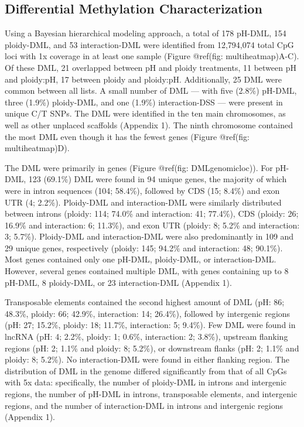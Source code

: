 \documentclass [11pt, proquest] {uwthesis}[2015/03/03]
\begin{document}
\hypertarget{differential-methylation-characterization}{%
\subsection{Differential Methylation Characterization}\label{differential-methylation-characterization}}

Using a Bayesian hierarchical modeling approach, a total of 178 pH-DML, 154 ploidy-DML, and 53 interaction-DML were identified from 12,794,074 total CpG loci with 1x coverage in at least one sample (Figure @ref(fig: multiheatmap)A-C). Of these DML, 21 overlapped between pH and ploidy treatments, 11 between pH and ploidy:pH, 17 between ploidy and ploidy:pH. Additionally, 25 DML were common between all lists. A small number of DML --- with five (2.8\%) pH-DML, three (1.9\%) ploidy-DML, and one (1.9\%) interaction-DSS --- were present in unique C/T SNPs. The DML were identified in the ten main chromosomes, as well as other unplaced scaffolds (Appendix 1). The ninth chromosome contained the most DML even though it has the fewest genes (Figure @ref(fig: multiheatmap)D).

The DML were primarily in genes (Figure @ref(fig: DMLgenomicloc)). For pH-DML, 123 (69.1\%) DML were found in 94 unique genes, the majority of which were in intron sequences (104; 58.4\%), followed by CDS (15; 8.4\%) and exon UTR (4; 2.2\%). Ploidy-DML and interaction-DML were similarly distributed between introns (ploidy: 114; 74.0\% and interaction: 41; 77.4\%), CDS (ploidy: 26; 16.9\% and interaction: 6; 11.3\%), and exon UTR (ploidy: 8; 5.2\% and interaction: 3; 5.7\%). Ploidy-DML and interaction-DML were also predominantly in 109 and 29 unique genes, respectively (ploidy: 145; 94.2\% and interaction: 48; 90.1\%). Most genes contained only one pH-DML, ploidy-DML, or interaction-DML. However, several genes contained multiple DML, with genes containing up to 8 pH-DML, 8 ploidy-DML, or 23 interaction-DML (Appendix 1).

Transposable elements contained the second highest amount of DML (pH: 86; 48.3\%, ploidy: 66; 42.9\%, interaction: 14; 26.4\%), followed by intergenic regions (pH: 27; 15.2\%, ploidy: 18; 11.7\%, interaction: 5; 9.4\%). Few DML were found in lncRNA (pH: 4; 2.2\%, ploidy: 1; 0.6\%, interaction: 2; 3.8\%), upstream flanking regions (pH: 2; 1.1\% and ploidy: 8; 5.2\%), or downstream flanks (pH: 2; 1.1\% and ploidy: 8; 5.2\%). No interaction-DML were found in either flanking region. The distribution of DML in the genome differed significantly from that of all CpGs with 5x data: specifically, the number of ploidy-DML in introns and intergenic regions, the number of pH-DML in introns, transposable elements, and intergenic regions, and the number of interaction-DML in introns and intergenic regions (Appendix 1).
\end{document}
